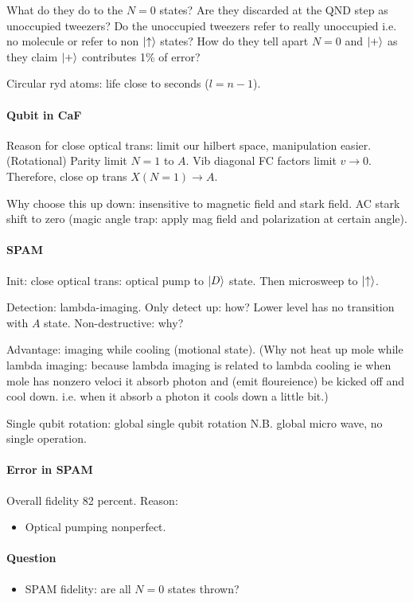 \documentclass{article}
\begin{document}
\par
{\color{red}What do they do to the $N=0$ states? Are they discarded at the QND step as unoccupied tweezers? Do the unoccupied tweezers refer to really unoccupied i.e. no molecule or refer to non $\ket{\uparrow}$ states? How do they tell apart $N=0$ and $\ket{+}$ as they claim $\ket{+}$ contributes 1\% of error?}

\clearpage

Circular ryd atoms: life close to seconds ($l=n-1$).



\paragraph*{Qubit in CaF}
Reason for close optical trans: limit our hilbert space, manipulation easier.
(Rotational) Parity limit $N=1$ to $A$.
Vib diagonal FC factors limit $v\rightarrow 0$.
Therefore, close op trans $X(N=1)\rightarrow A$.

Why choose this up down: insensitive to magnetic field and stark field. 
AC stark shift to zero (magic angle trap: apply mag field and polarization at certain angle).


\paragraph*{SPAM}
Init: close optical trans: optical pump to $\ket{D}$ state. Then microsweep to $\ket{\uparrow}$.


Detection: lambda-imaging.
Only detect up: how?
Lower level has no transition with $A$ state.
Non-destructive: why?



Advantage: imaging while cooling (motional state).
(Why not heat up mole while lambda imaging: because lambda imaging is related to lambda cooling ie when mole has nonzero veloci it absorb photon and (emit floureience) be kicked off and cool down. i.e. when it absorb a photon it cools down a little bit.)





Single qubit rotation: global single qubit rotation N.B. global micro wave, no single operation.



\paragraph*{Error in SPAM}

Overall fidelity 82 percent.
Reason:
\begin{itemize}
    \item Optical pumping nonperfect.
\end{itemize}


\paragraph*{Question}
\begin{itemize}
    \item SPAM fidelity: are all $N=0$ states thrown?
\end{itemize}

% 
% 
\end{document}
